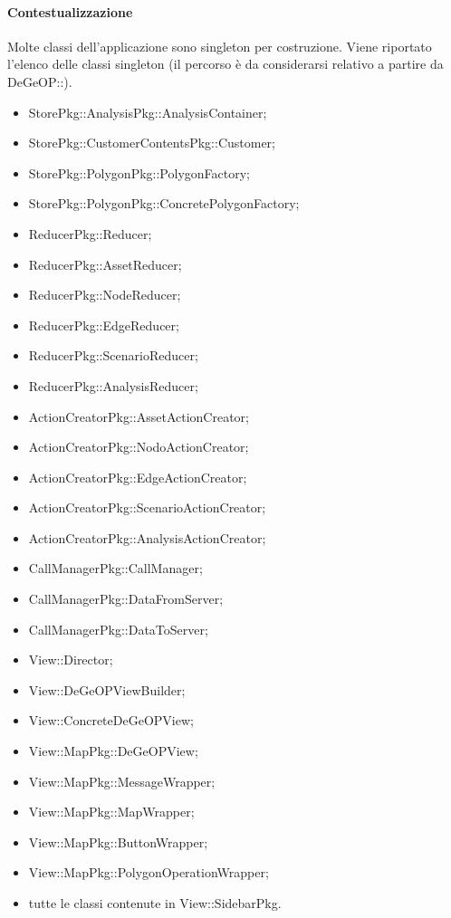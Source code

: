 \paragraph{Contestualizzazione}
Molte classi dell'applicazione sono singleton per costruzione.
Viene riportato l'elenco delle classi singleton (il percorso è da considerarsi relativo a partire da DeGeOP::).
\begin{itemize}
	\item StorePkg::AnalysisPkg::AnalysisContainer;
	\item StorePkg::CustomerContentsPkg::Customer;
	\item StorePkg::PolygonPkg::PolygonFactory;
	\item StorePkg::PolygonPkg::ConcretePolygonFactory;
	\item ReducerPkg::Reducer;
	\item ReducerPkg::AssetReducer;
	\item ReducerPkg::NodeReducer;
	\item ReducerPkg::EdgeReducer;
	\item ReducerPkg::ScenarioReducer;
	\item ReducerPkg::AnalysisReducer;
	\item ActionCreatorPkg::AssetActionCreator;
	\item ActionCreatorPkg::NodoActionCreator;
	\item ActionCreatorPkg::EdgeActionCreator;
	\item ActionCreatorPkg::ScenarioActionCreator;
	\item ActionCreatorPkg::AnalysisActionCreator;
	\item CallManagerPkg::CallManager;
	\item CallManagerPkg::DataFromServer;
	\item CallManagerPkg::DataToServer;
	\item View::Director;
	\item View::DeGeOPViewBuilder;
	\item View::ConcreteDeGeOPView;
	\item View::MapPkg::DeGeOPView;
	\item View::MapPkg::MessageWrapper;
	\item View::MapPkg::MapWrapper;
	\item View::MapPkg::ButtonWrapper;
	\item View::MapPkg::PolygonOperationWrapper;
	\item tutte le classi contenute in View::SidebarPkg.
\end{itemize}

